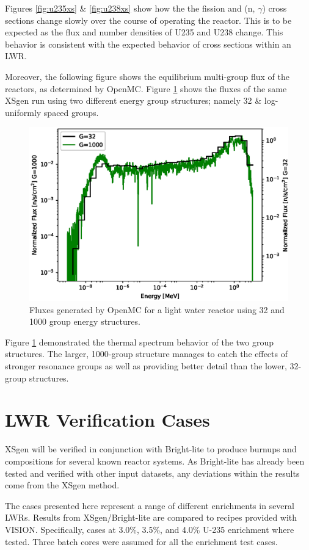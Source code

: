 \documentclass{article}
\begin{document}
Figures \ref{fig:u235xs} \& \ref{fig:u238xs} show how the the fission and (n, $\gamma$)
cross sections change slowly over the course of operating the reactor. This is to be
expected as the flux and number densities of U235 and U238 change. 
This behavior is consistent with the expected behavior of cross sections within an LWR.

Moreover, the following figure shows the equilibrium multi-group flux of the reactors, as
determined by OpenMC.
Figure \ref{fig:32g} shows the fluxes of the same XSgen run using two different energy group
structures; namely 32 \& log-uniformly spaced groups.
\begin{figure}[h]
  \center
  \includegraphics[scale=0.7]{fluxes.eps}
  \caption{Fluxes generated by OpenMC for a light water reactor using 32 and 1000 group energy structures.}
  \label{fig:32g}
\end{figure}
Figure \ref{fig:32g} demonstrated the thermal spectrum behavior of the two group structures.
The larger, 1000-group structure manages to catch the effects of stronger resonance groups
as well as providing better detail than the lower, 32-group structures.

\section{LWR Verification Cases}
\label{sec:LWRv}
XSgen will be verified in conjunction with Bright-lite to produce burnups and
compositions for several known reactor systems. As Bright-lite has already been tested
and verified with other input datasets\cite{brightlite},
any deviations within the results come from the XSgen method.

The cases presented here represent a range of different enrichments in several LWRs.
Results from XSgen/Bright-lite are compared to recipes provided with VISION\cite{vision}.
Specifically, cases at 3.0\%, 3.5\%, and 4.0\% U-235 enrichment where tested.
Three batch cores were assumed for all the enrichment test cases.
\end{document}
